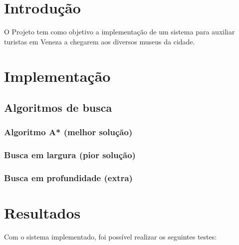\documentclass[12pt, a4paper]{article}
\begin{document}
\capa%
\tableofcontents\cleardoublepage%

\section{Introdução}\label{sec:intro}
O Projeto tem como objetivo a implementação de um sistema para auxiliar turistas em Veneza a chegarem aos diversos museus da cidade.

\section{Implementação}\label{sec:impl}

\subsection{Algoritmos de busca}\label{sec:algoritmos}
\subsubsection{Algoritmo A* (melhor solução)}\label{sec:astar}
\subsubsection{Busca em largura (pior solução)}\label{sec:bl}
\subsubsection{Busca em profundidade (extra)}\label{sec:bp}

\section{Resultados}\label{sec:resultados}
Com o sistema implementado, foi possível realizar os seguintes testes:
\end{document}

